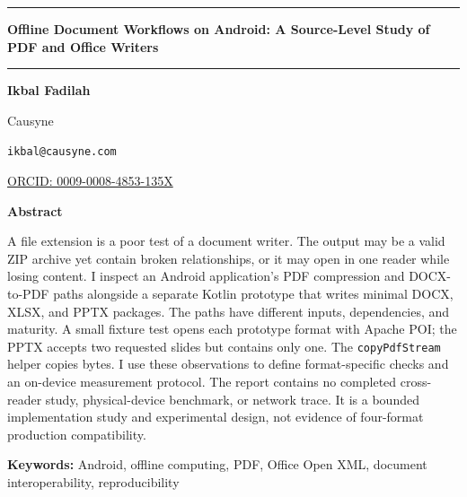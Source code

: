 \documentclass[10pt,letterpaper]{article}
\begin{document}
\begin{center}

\rule{\textwidth}{0.8pt}\par\vspace{0.6em}

{\LARGE\bfseries Offline Document Workflows on Android: A Source-Level Study of PDF and Office Writers\par}

\vspace{0.6em}\rule{\textwidth}{0.4pt}\par\vspace{1.2em}

{\normalsize\bfseries Ikbal Fadilah\par}

Causyne\par

\texttt{ikbal@causyne.com}\par
\href{https://orcid.org/0009-0008-4853-135X}{ORCID: 0009-0008-4853-135X}\par

\end{center}

\vspace{1.0em}

\begin{center}

\begin{minipage}{0.82\textwidth}

\begin{center}\bfseries Abstract\end{center}

A file extension is a poor test of a document writer. The output may be a valid ZIP archive yet contain broken relationships, or it may open in one reader while losing content. I inspect an Android application's PDF compression and DOCX-to-PDF paths alongside a separate Kotlin prototype that writes minimal DOCX, XLSX, and PPTX packages. The paths have different inputs, dependencies, and maturity. A small fixture test opens each prototype format with Apache POI; the PPTX accepts two requested slides but contains only one. The \texttt{copyPdfStream} helper copies bytes. I use these observations to define format-specific checks and an on-device measurement protocol. The report contains no completed cross-reader study, physical-device benchmark, or network trace. It is a bounded implementation study and experimental design, not evidence of four-format production compatibility.

\par\vspace{0.45em}\noindent\textbf{Keywords:}  Android, offline computing, PDF, Office Open XML, document interoperability, reproducibility\par

\end{minipage}

\end{center}
\end{document}

